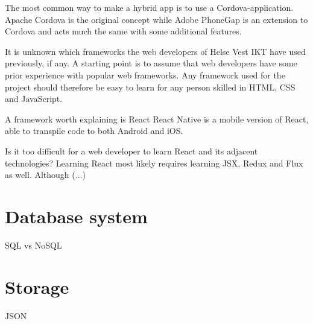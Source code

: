 The most common way to make a hybrid app is to use a Cordova-application. Apache Cordova is the original concept while Adobe PhoneGap is an extension to Cordova and acts much the same with some additional features.

It is unknown which frameworks the web developers of Helse Vest IKT have used previously, if any. A starting point is to assume that web developers have some prior experience with popular web frameworks. Any framework used for the project should therefore be easy to learn for any person skilled in HTML, CSS and JavaScript.

A framework worth explaining is React
React Native is a mobile version of React, able to transpile code to both Android and iOS.

Is it too difficult for a web developer to learn React and its adjacent technologies? Learning React most likely requires learning JSX, Redux and Flux as well. Although (...)

\section{Database system}

SQL vs NoSQL

\section{Storage}

JSON



